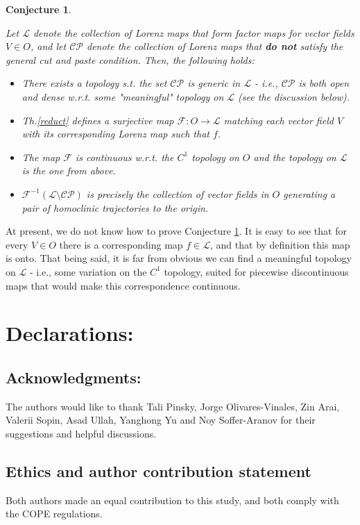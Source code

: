 \documentclass[10pt,reqno]{amsart}
\theoremstyle{plain}
\theoremstyle{assumption}
\theoremstyle{notation}
\theoremstyle{claim}
\theoremstyle{conj}
\theoremstyle{theorem}
\newtheorem{conjecture}{Conjecture}[section]
\theoremstyle{proposition}
\theoremstyle{corollary}
\begin{document}
\begin{conjecture} \label{condition2}

Let $\mathcal{L}$ denote the collection of Lorenz maps that form factor maps for vector fields $V\in O$, and let $\mathcal{CP}$ denote the collection of Lorenz maps that \textbf{do not} satisfy the general cut and paste condition. Then, the following holds:
\begin{itemize}
    \item There exists a topology s.t. the set $\mathcal{CP}$ is generic in $\mathcal{L}$ - i.e., $\mathcal{CP}$ is both open and dense w.r.t. some "meaningful" topology on $\mathcal{L}$ (see the discussion below).
    \item Th.\ref{reduct} defines a surjective map $\mathcal{F}:O\to\mathcal{L}$ matching each vector field $V$ with its corresponding Lorenz map such that $f$. 
    \item The map $\mathcal{F}$ is continuous w.r.t. the $C^1$ topology on $O$ and the topology  on $\mathcal{L}$ is the one from above.
    \item $\mathcal{F}^{-1}(\mathcal{L}\setminus\mathcal{CP})$ is precisely the collection of vector fields in $O$ generating a pair of homoclinic trajectories to the origin.
\end{itemize}
\end{conjecture}

At present, we do not know how to prove Conjecture \ref{condition2}. It is easy to see that for every $V\in O$ there is a corresponding map $f\in\mathcal{L}$, and that by definition this map is onto. That being said, it is far from obvious we can find a meaningful topology on $\mathcal{L}$ - i.e., some variation on the $C^1$ topology, suited for piecewise discontinuous maps that would make this correspondence continuous. 

\section*{Declarations:}
\subsection*{Acknowledgments:}
The authors would like to thank Tali Pinsky, Jorge Olivares-Vinales, Zin Arai, Valerii Sopin, Asad Ullah, Yanghong Yu and Noy Soffer-Aranov for their suggestions and helpful discussions.
\subsection*{Ethics and author contribution statement}
 Both authors made an equal contribution to this study, and both comply with the COPE regulations.
\end{document}

